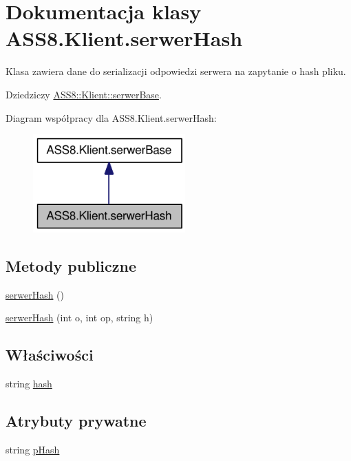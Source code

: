 \hypertarget{a00024}{
\section{Dokumentacja klasy ASS8.Klient.serwerHash}
\label{dc/de2/a00024}
}
Klasa zawiera dane do serializacji odpowiedzi serwera na zapytanie o hash pliku.  


Dziedziczy \hyperlink{a00023}{ASS8::Klient::serwerBase}.

Diagram współpracy dla ASS8.Klient.serwerHash:\nopagebreak
\begin{figure}[H]
\begin{center}
\leavevmode
\includegraphics[width=166pt]{dd/dc1/a00212}
\end{center}
\end{figure}
\subsection*{Metody publiczne}
\begin{CompactItemize}
\item 
\hyperlink{a00024_79c7996d2e3af0a5ccceed0a8571f365}{serwerHash} ()
\item 
\hyperlink{a00024_c5d6f7f180298714d66df1b3651de900}{serwerHash} (int o, int op, string h)
\end{CompactItemize}
\subsection*{Właściwości}
\begin{CompactItemize}
\item 
string \hyperlink{a00024_7a7a7837aebfd93a49cc82322210f287}{hash}
\end{CompactItemize}
\subsection*{Atrybuty prywatne}
\begin{CompactItemize}
\item 
string \hyperlink{a00024_e3111f0da2c2e6180ae82949844b5111}{pHash}
\end{CompactItemize}


